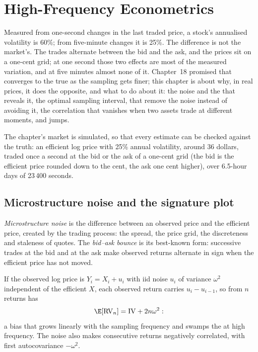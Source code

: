 \chapter{High-Frequency Econometrics}\label{ch:qm:high-frequency-econometrics}

Measured from one-second changes in the last traded price, a stock's annualised volatility is 60\%; from five-minute changes it is 25\%. The
difference is not the market's. The trades alternate between the bid and the ask, and the prices sit on a one-cent grid; at one second those two
effects are most of the measured variation, and at five minutes almost none of it. Chapter~18 promised that  converges to the true
 as the sampling gets finer; this chapter is about why, in real prices, it does the opposite, and what to do about it: the noise
and the  that reveals it, the optimal sampling interval,  that remove the noise instead of avoiding it, the correlation that
vanishes when two assets trade at different moments, and jumps.

The chapter's market is simulated, so that every estimate can be checked against the truth: an efficient log price with 25\% annual volatility, around
36 dollars, traded once a second at the bid or the ask of a one-cent grid (the bid is the efficient price rounded down to the cent, the ask one cent
higher), over 6.5-hour days of 23\,400 seconds.

\section{Microstructure noise and the signature plot}

\begin{definition}\label{def:qm:high-frequency-econometrics:noise}
\emph{Microstructure noise} is the difference between an observed price and the efficient price, created by the trading process: the
spread, the price grid, the discreteness and staleness of quotes. The \emph{bid--ask bounce} is its best-known form: successive trades at the
bid and at the ask make observed returns alternate in sign when the efficient price has not moved.
\end{definition}

If the observed log price is $Y_i = X_i + u_i$ with iid noise $u_i$ of variance $\omega^2$ independent of the efficient $X$, each observed return carries $u_i - u_{i-1}$, so
 from $n$ returns has
\[
\E[\mathrm{RV}_n] = \mathrm{IV} + 2n\omega^2:
\]
a bias that grows linearly with the sampling frequency and swamps the  at high frequency. The noise also makes consecutive returns
negatively correlated, with first autocovariance $-\omega^2$.

